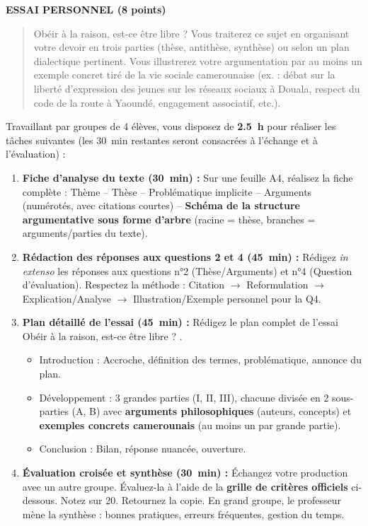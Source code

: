 \documentclass[11pt]{article}
\newcounter{popsec}
\newcounter{popsub}
\newcommand{\courssub}[1]{%
  \stepcounter{popsub}%
  \par\vspace{9pt}\noindent{\popxbold\fontsize{11.5}{13}\selectfont\color{popink}{\color{poporange}\thepopsec.\thepopsub}\hspace{6pt}#1}\par\nopagebreak\vspace{4pt}
}
\begin{document}
\textbf{ESSAI PERSONNEL (8 points)}
\begin{quote}
\og Obéir à la raison, est-ce être libre ? \fg
Vous traiterez ce sujet en organisant votre devoir en trois parties (thèse, antithèse, synthèse) ou selon un plan dialectique pertinent. Vous illustrerez votre argumentation par au moins un exemple concret tiré de la vie sociale camerounaise (ex. : débat sur la liberté d'expression des jeunes sur les réseaux sociaux à Douala, respect du code de la route à Yaoundé, engagement associatif, etc.).
\end{quote}

\courssub{Consignes}
Travaillant par groupes de 4 élèves, vous disposez de \textbf{\SI{2,5}{h}} pour réaliser les tâches suivantes (les \SI{30}{min} restantes seront consacrées à l'échange et à l'évaluation) :

\begin{enumerate}
    \item \textbf{Fiche d'analyse du texte (\SI{30}{min}) :} Sur une feuille A4, réalisez la fiche complète : Thème -- Thèse -- Problématique implicite -- Arguments (numérotés, avec citations courtes) -- \textbf{Schéma de la structure argumentative sous forme d'arbre} (racine = thèse, branches = arguments/parties du texte).
    \item \textbf{Rédaction des réponses aux questions 2 et 4 (\SI{45}{min}) :} Rédigez \emph{in extenso} les réponses aux questions n°2 (Thèse/Arguments) et n°4 (Question d'évaluation). Respectez la méthode : Citation $\rightarrow$ Reformulation $\rightarrow$ Explication/Analyse $\rightarrow$ Illustration/Exemple personnel pour la Q4.
    \item \textbf{Plan détaillé de l'essai (\SI{45}{min}) :} Rédigez le plan complet de l'essai \og Obéir à la raison, est-ce être libre ? \fg.
    \begin{itemize}
        \item Introduction : Accroche, définition des termes, problématique, annonce du plan.
        \item Développement : 3 grandes parties (I, II, III), chacune divisée en 2 sous-parties (A, B) avec \textbf{arguments philosophiques} (auteurs, concepts) et \textbf{exemples concrets camerounais} (au moins un par grande partie).
        \item Conclusion : Bilan, réponse nuancée, ouverture.
    \end{itemize}
    \item \textbf{Évaluation croisée et synthèse (\SI{30}{min}) :} Échangez votre production avec un autre groupe. Évaluez-la à l'aide de la \textbf{grille de critères officiels} ci-dessous. Notez sur 20. Retournez la copie. En grand groupe, le professeur mène la synthèse : bonnes pratiques, erreurs fréquentes, gestion du temps.
\end{enumerate}
\end{document}
